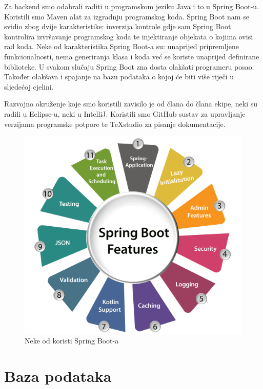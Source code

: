     Za backend smo odabrali raditi u programskom jeziku Java i to u Spring Boot-u. Koristili smo Maven alat za izgradnju programskog koda. Spring Boot nam se svidio zbog dvije karakteristike: inverzija kontrole gdje sam Spring Boot kontrolira izvršavanje programskog koda te injektiranje objekata o kojima ovisi rad koda. Neke od karakteristika Spring Boot-a su: unaprijed pripremljene funkcionalnosti, nema generiranja klasa i koda već se koriste unaprijed definirane biblioteke. U svakom slučaju Spring Boot zna dosta olakšati programeru posao. Također olakšava i spajanje na bazu podataka o kojoj će biti više riječi u sljedećoj cjelini.
    
    Razvojno okruženje koje smo koristili zavisilo je od člana do člana ekipe, neki su radili u Eclipse-u, neki u IntelliJ. Koristili smo GitHub sustav za upravljanje verzijama programske potpore te TeXstudio za pisanje dokumentacije.
    
    \begin{figure}[H]
    	\includegraphics[scale=0.5]{slike/SpringBoot.PNG} %
    	\centering
    	\caption{Neke od koristi Spring Boot-a}
    	\label{fig:promjene}
    \end{figure}
		

				
	\section{Baza podataka}
			
